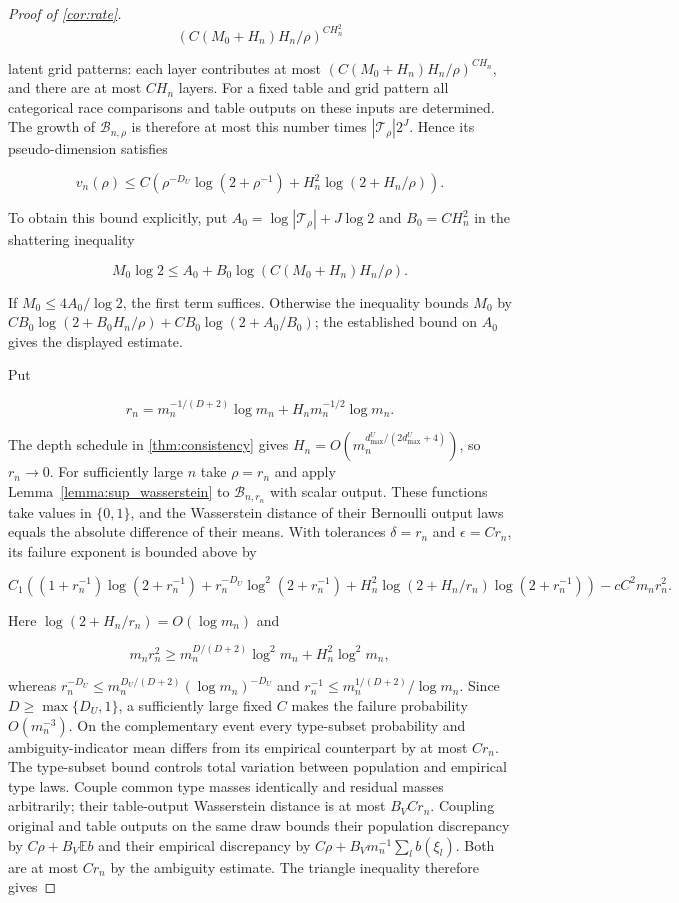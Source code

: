 \begin{proof}[Proof of \cref{cor:rate}]
\[
(C(M_0+H_n)H_n/\rho)^{CH_n^2}
\]

latent grid patterns: each layer contributes at most $(C(M_0+H_n)H_n/\rho)^{CH_n}$, and there are at most $CH_n$ layers. For a fixed table and grid pattern all categorical race comparisons and table outputs on these inputs are determined. The growth of $\mathcal B_{n,\rho}$ is therefore at most this number times $|\mathcal T_\rho|2^J$. Hence its pseudo-dimension satisfies

\[
v_n(\rho)\leqslant C\left(\rho^{-D_U}\log(2+\rho^{-1})+H_n^2\log(2+H_n/\rho)\right).
\]

To obtain this bound explicitly, put $A_0=\log|\mathcal T_\rho|+J\log2$ and $B_0=CH_n^2$ in the shattering inequality

\[
M_0\log2\leqslant A_0+B_0\log(C(M_0+H_n)H_n/\rho).
\]

If $M_0\leqslant4A_0/\log2$, the first term suffices. Otherwise the inequality bounds $M_0$ by $CB_0\log(2+B_0H_n/\rho)+CB_0\log(2+A_0/B_0)$; the established bound on $A_0$ gives the displayed estimate. 

Put

\[
r_n=m_n^{-1/(D+2)}\log m_n+H_nm_n^{-1/2}\log m_n.
\]

The depth schedule in \cref{thm:consistency} gives $H_n=O(m_n^{d_{\max}^U/(2d_{\max}^U+4)})$, so $r_n\rightarrow0$. For sufficiently large $n$ take $\rho=r_n$ and apply Lemma~\ref{lemma:sup_wasserstein} to $\mathcal B_{n,r_n}$ with scalar output. These functions take values in $\{0,1\}$, and the Wasserstein distance of their Bernoulli output laws equals the absolute difference of their means. With tolerances $\delta=r_n$ and $\epsilon=Cr_n$, its failure exponent is bounded above by

\[
C_1\left((1+r_n^{-1})\log(2+r_n^{-1})+r_n^{-D_U}\log^2(2+r_n^{-1})+H_n^2\log(2+H_n/r_n)\log(2+r_n^{-1})\right)-cC^2m_nr_n^2.
\]

Here $\log(2+H_n/r_n)=O(\log m_n)$ and

\[
m_nr_n^2\geqslant m_n^{D/(D+2)}\log^2m_n+H_n^2\log^2m_n,
\]

whereas $r_n^{-D_U}\leqslant m_n^{D_U/(D+2)}(\log m_n)^{-D_U}$ and $r_n^{-1}\leqslant m_n^{1/(D+2)}/\log m_n$. Since $D\geqslant\max\{D_U,1\}$, a sufficiently large fixed $C$ makes the failure probability $O(m_n^{-3})$. On the complementary event every type-subset probability and ambiguity-indicator mean differs from its empirical counterpart by at most $Cr_n$. The type-subset bound controls total variation between population and empirical type laws. Couple common type masses identically and residual masses arbitrarily; their table-output Wasserstein distance is at most $B_VCr_n$. Coupling original and table outputs on the same draw bounds their population discrepancy by $C\rho+B_V\mathbb E b$ and their empirical discrepancy by $C\rho+B_Vm_n^{-1}\sum_l b(\xi_l)$. Both are at most $Cr_n$ by the ambiguity estimate. The triangle inequality therefore gives


\end{proof}
